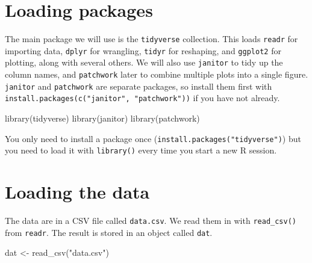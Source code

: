\documentclass[
  english,
  letterpaper,
]{book}
\newenvironment{Shaded}{\begin{snugshade}}{\end{snugshade}}
\newcommand{\FunctionTok}[1]{\textcolor[rgb]{0.28,0.35,0.67}{#1}}
\newcommand{\NormalTok}[1]{\textcolor[rgb]{0.00,0.23,0.31}{#1}}
\newcommand{\OtherTok}[1]{\textcolor[rgb]{0.00,0.23,0.31}{#1}}
\newcommand{\StringTok}[1]{\textcolor[rgb]{0.13,0.47,0.30}{#1}}
\begin{document}
\section{Loading packages}\label{loading-packages}

The main package we will use is the \texttt{tidyverse} collection. This
loads \texttt{readr} for importing data, \texttt{dplyr} for wrangling,
\texttt{tidyr} for reshaping, and \texttt{ggplot2} for plotting, along
with several others. We will also use \texttt{janitor} to tidy up the
column names, and \texttt{patchwork} later to combine multiple plots
into a single figure. \texttt{janitor} and \texttt{patchwork} are
separate packages, so install them first with
\texttt{install.packages(c("janitor",\ "patchwork"))} if you have not
already.

\begin{Shaded}
\begin{Highlighting}[]
\FunctionTok{library}\NormalTok{(tidyverse)}
\FunctionTok{library}\NormalTok{(janitor)}
\FunctionTok{library}\NormalTok{(patchwork)}
\end{Highlighting}
\end{Shaded}

\begin{tcolorbox}[enhanced jigsaw, colframe=quarto-callout-tip-color-frame, breakable, left=2mm, leftrule=.75mm, toptitle=1mm, rightrule=.15mm, opacitybacktitle=0.6, arc=.35mm, colback=white, title=\textcolor{quarto-callout-tip-color}{\faLightbulb}\hspace{0.5em}{Tip}, coltitle=black, colbacktitle=quarto-callout-tip-color!10!white, toprule=.15mm, bottomtitle=1mm, opacityback=0, titlerule=0mm, bottomrule=.15mm]

You only need to install a package once
(\texttt{install.packages("tidyverse")}) but you need to load it with
\texttt{library()} every time you start a new R session.

\end{tcolorbox}

\section{Loading the data}\label{loading-the-data}

The data are in a CSV file called \texttt{data.csv}. We read them in
with \texttt{read\_csv()} from \texttt{readr}. The result is stored in
an object called \texttt{dat}.

\begin{Shaded}
\begin{Highlighting}[]
\NormalTok{dat }\OtherTok{\textless{}{-}} \FunctionTok{read\_csv}\NormalTok{(}\StringTok{"data.csv"}\NormalTok{)}
\end{Highlighting}
\end{Shaded}
\end{document}
